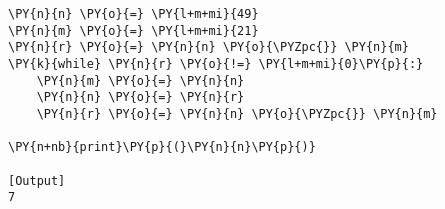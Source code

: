\begin{Verbatim}[label=\makebox{\href{https://github.com/unipi-physics-labs/statnotes/tree/main/snippy/euclid_algorithm.py}{https://github.com/.../euclid\_algorithm.py}},commandchars=\\\{\}]
\PY{n}{n} \PY{o}{=} \PY{l+m+mi}{49}
\PY{n}{m} \PY{o}{=} \PY{l+m+mi}{21}
\PY{n}{r} \PY{o}{=} \PY{n}{n} \PY{o}{\PYZpc{}} \PY{n}{m}
\PY{k}{while} \PY{n}{r} \PY{o}{!=} \PY{l+m+mi}{0}\PY{p}{:}
    \PY{n}{m} \PY{o}{=} \PY{n}{n}
    \PY{n}{n} \PY{o}{=} \PY{n}{r}
    \PY{n}{r} \PY{o}{=} \PY{n}{n} \PY{o}{\PYZpc{}} \PY{n}{m}

\PY{n+nb}{print}\PY{p}{(}\PY{n}{n}\PY{p}{)}

[Output]
7
\end{Verbatim}
